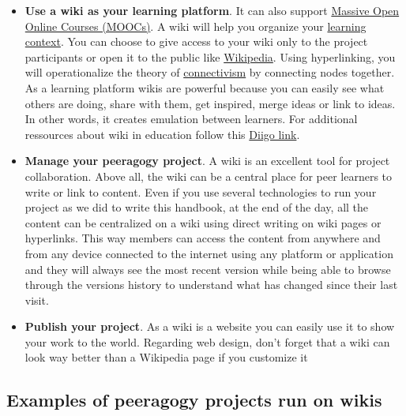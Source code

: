 \begin{itemize}
\item
  \textbf{Use a wiki as your learning platform}. It can also support
  \href{http://socialmediaclassroom.com/host/peeragogy/wiki/connectivism-practice-how-organize-a-mooc}{Massive
  Open Online Courses (MOOCs)}. A wiki will help you organize your
  \href{http://socialmediaclassroom.com/host/peeragogy/wiki/organizing-a-learning-context}{learning
  context}. You can choose to give access to your wiki only to the
  project participants or open it to the public like
  \href{http://www.wikipedia.org/}{Wikipedia}. Using hyperlinking, you
  will operationalize the theory of
  \href{http://en.wikipedia.org/wiki/Connectivism}{connectivism} by
  connecting nodes together. As a learning platform wikis are powerful
  because you can easily see what others are doing, share with them, get
  inspired, merge ideas or link to ideas. In other words, it creates
  emulation between learners. For additional ressources about wiki in
  education follow this 
  \href{http://www.diigo.com/user/regisb/wiki\%20education}{Diigo link}.
\end{itemize}
\begin{itemize}
\item
  \textbf{Manage your peeragogy project}. A wiki is an excellent tool
  for project collaboration. Above all, the wiki can be a central place
  for peer learners to write or link to content. Even if you use several
  technologies to run your project as we did to write this handbook, at
  the end of the day, all the content can be centralized on a wiki using
  direct writing on wiki pages or hyperlinks. This way members can
  access the content from anywhere and from any device connected to the
  internet using any platform or application and they will always see
  the most recent version while being able to browse through the
  versions history to understand what has changed since their last
  visit.
\end{itemize}
\begin{itemize}
\item
  \textbf{Publish your project}. As a wiki is a website you can easily
  use it to show your work to the world. Regarding web design, don't
  forget that a wiki can look way better than a Wikipedia page if you
  customize it
\end{itemize}
\subsection{Examples of peeragogy projects run on wikis}

